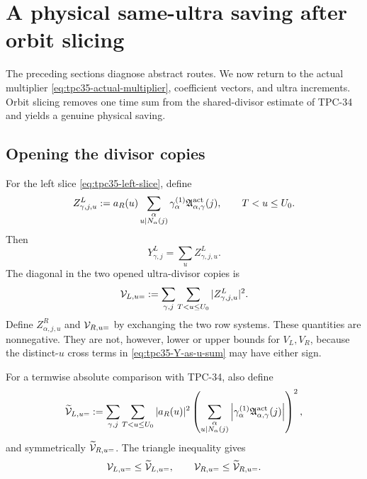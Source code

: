 \section{A physical same-ultra saving after orbit slicing}
\label{sec:tpc35-physical-ultra}

The preceding sections diagnose abstract routes.  We now return to the
actual multiplier \eqref{eq:tpc35-actual-multiplier}, coefficient vectors,
and ultra increments.  Orbit slicing removes one time sum from the
shared-divisor estimate of TPC-34 and yields a genuine physical saving.

\subsection{Opening the divisor copies}

For the left slice \eqref{eq:tpc35-left-slice}, define
\begin{equation}
 Z_{\gamma,j,u}^L
 :=a_R(u)
 \sum_{\substack{\alpha\\u\mid N_\alpha(j)}}
 \gamma_\alpha^{(1)}
 \mathfrak A_{\alpha,\gamma}^{\rm act}(j),
 \qquad T<u\le U_0.
 \label{eq:tpc35-left-u-slice}
\end{equation}
Then
\begin{equation}
 Y_{\gamma,j}^L=\sum_uZ_{\gamma,j,u}^L.
 \label{eq:tpc35-Y-as-u-sum}
\end{equation}
The diagonal in the two opened ultra-divisor copies is
\begin{equation}
 \mathcal V_{L,u=}:=\sum_{\gamma,j}\sum_{T<u\le U_0}
 |Z_{\gamma,j,u}^L|^2.
 \label{eq:tpc35-left-same-u}
\end{equation}
Define \(Z_{\alpha,j,u}^R\) and \(\mathcal V_{R,u=}\) by exchanging the two row
systems.  These quantities are nonnegative.  They are not, however,
lower or upper bounds for \(V_L,V_R\), because the distinct-\(u\) cross
terms in \eqref{eq:tpc35-Y-as-u-sum} may have either sign.

For a termwise absolute comparison with TPC-34, also define
\begin{equation}
 \widetilde{\mathcal V}_{L,u=}
 :=\sum_{\gamma,j}\sum_{T<u\le U_0}|a_R(u)|^2
 \left(
 \sum_{\substack{\alpha\\u\mid N_\alpha(j)}}
 \left|
 \gamma_\alpha^{(1)}
 \mathfrak A_{\alpha,\gamma}^{\rm act}(j)
 \right|
 \right)^2,
 \label{eq:tpc35-left-absolute-same-u}
\end{equation}
and symmetrically \(\widetilde{\mathcal V}_{R,u=}\).  The triangle inequality
gives
\begin{equation}
 \mathcal V_{L,u=}\le\widetilde{\mathcal V}_{L,u=},
 \qquad
 \mathcal V_{R,u=}\le\widetilde{\mathcal V}_{R,u=}.
 \label{eq:tpc35-same-u-majorization}
\end{equation}

